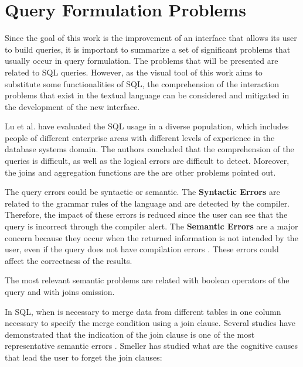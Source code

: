 \section{Query Formulation Problems}
\label{sec:query_formulation_problems}
Since the goal of this work is the improvement of an interface that allows its user to build queries, it is important to summarize a set of significant problems that usually occur in query formulation. The problems that will be presented are related to SQL queries. However, as the visual tool of this work aims to substitute some functionalities of SQL, the comprehension of the interaction problems that exist in the textual language can be considered and mitigated in the development of the new interface. 

Lu et al. \cite{aSurveyOnUsageOfSQL} have evaluated the SQL usage in a diverse population, which includes people of different enterprise areas with different levels of experience in the database systems domain. The authors concluded that the comprehension of the queries is difficult, as well as the logical errors are difficult to detect. Moreover, the joins and aggregation functions are the are other problems pointed out.

The query errors could be syntactic or semantic. The \textbf{Syntactic Errors} are related to the grammar rules of the language and are detected by the compiler. Therefore, the impact of these errors is reduced since the user can see that the query is incorrect through the compiler alert. The \textbf{Semantic Errors} are a major concern because they occur when the returned information is not intended by the user, even if the query does not have compilation errors \cite{userErrorsInDatabaseQueryComposition}. These errors could affect the correctness of the results.

The most relevant semantic problems are related with boolean operators of the query and with joins omission.

In SQL, when is necessary to merge data from different tables in one column necessary to specify the merge condition using a join clause. Several studies have demonstrated that the indication of the join clause is one of the most representative semantic errors \cite{studentsSemanticMistakesInWritingSevenDifferentTypesOfSQLQueries} \cite{aSurveyOnUsageOfSQL}. Smeller \cite{userErrorsInDatabaseQueryComposition} has studied what are the cognitive causes that lead the user to forget the join clauses:

